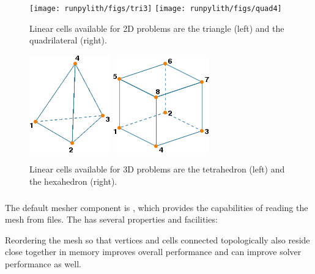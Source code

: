 \begin{figure}[htbp]
  \texttt{[image: runpylith/figs/tri3]}\hspace*{0.5in}%
  \texttt{[image: runpylith/figs/quad4]}
  \caption{Linear cells available for 2D problems are the triangle
    (left) and the quadrilateral (right).}
  \label{fig:2D:cells}
\end{figure}

\begin{figure}[htbp]
  \includegraphics[scale=0.6]{runpylith/figs/tet4}\hspace*{0.5in}%
  \includegraphics[scale=0.6]{runpylith/figs/hex8}
  \caption{Linear cells available for 3D problems are the tetrahedron (left)
    and the hexahedron (right).}
  \label{fig:3D:cells}
\end{figure}

\subsubsection{}

The default mesher component is , which provides
the capabilities of reading the mesh from files. The  has
several properties and facilities:
\begin{inventory}
\end{inventory}
Reordering the mesh so that vertices and cells connected topologically
also reside close together in memory improves overall performance
and can improve solver performance as well.

